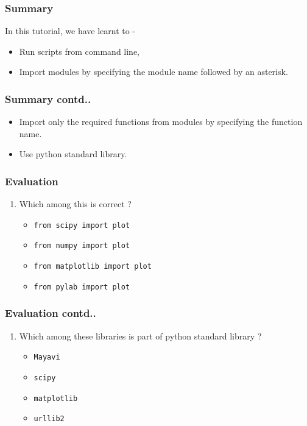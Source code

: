 \documentclass[17pt,compress]{beamer}
\newcounter{saveenumi}
\newcommand{\seti}{\setcounter{saveenumi}{\value{enumi}}}
\begin{document}
\begin{frame}
\frametitle{Summary}
\label{sec-15.1}

  In this tutorial, we have learnt to -

\begin{itemize}
\item Run scripts from command line,
\item Import modules by specifying the module name followed by  
    an asterisk.
\end{itemize}
\end{frame}
\begin{frame}
\frametitle{Summary contd..}
\label{sec-15.2}

\begin{itemize}
\item Import only the required functions from modules by specifying 
    the function name.
\item Use python standard library.
\end{itemize}
\end{frame}
\begin{frame}
\frametitle{Evaluation}
\label{sec-16.1}

\begin{enumerate}
\item Which among this is correct ?\pause
	\begin{itemize}
	\item \texttt{from scipy import plot}
	\item \texttt{from numpy import plot}
	\item \texttt{from matplotlib import plot}
	\item \texttt{from pylab import plot}
	\end{itemize}\pause
\seti
\end{enumerate}
\end{frame}
\begin{frame}
\frametitle{Evaluation contd..}
\label{sec-16.2}

\begin{enumerate}
\item Which among these libraries is part of python standard library ?\pause
	\begin{itemize}
	\item \texttt{Mayavi}
	\item \texttt{scipy}
	\item \texttt{matplotlib}
	\item \texttt{urllib2}
	\end{itemize}
\seti
\end{enumerate}
\end{frame}
\end{document}

